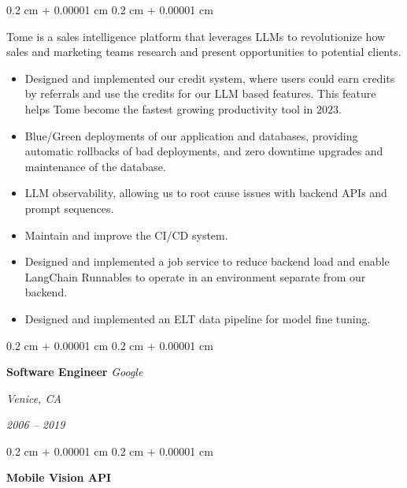 \documentclass[12pt, letterpaper]{article}
\newenvironment{highlights}{
    \begin{itemize}[
        topsep=0.10 cm,
        parsep=0.10 cm,
        partopsep=0pt,
        itemsep=0pt,
        leftmargin=0.4 cm + 10pt
    ]
}{
    \end{itemize}
} %
\newenvironment{onecolentry}{
    \begin{adjustwidth}{
        0.2 cm + 0.00001 cm
    }{
        0.2 cm + 0.00001 cm
    }
}{
    \end{adjustwidth}
} %
\newenvironment{twocolentry}[2][]{
    \onecolentry
    \def\secondColumn{#2}
    \setcolumnwidth{\fill, 4.5 cm}
    \begin{paracol}{2}
}{
    \switchcolumn \raggedleft \secondColumn
    \end{paracol}
    \endonecolentry
} %
\begin{document}
        \vspace{0.10 cm}
        \begin{onecolentry}
            Tome is a sales intelligence platform that leverages LLMs to revolutionize how sales and marketing teams research and present opportunities to potential clients.
            \begin{highlights}
                \item Designed and implemented our credit system, where users could earn credits by referrals and use the credits for our LLM based features.  This feature helps Tome become the fastest growing productivity tool in 2023.
                \item Blue/Green deployments of our application and databases, providing automatic rollbacks of bad deployments, and zero downtime upgrades and maintenance of the database.
                \item LLM observability, allowing us to root cause issues with backend APIs and prompt sequences.
                \item Maintain and improve the CI/CD system.
                \item Designed and implemented a job service to reduce backend load and enable LangChain Runnables to operate in an environment separate from our backend.
                \item Designed and implemented an ELT data pipeline for model fine tuning.
            \end{highlights}
        \end{onecolentry}

        \vspace{0.2 cm}

        \begin{twocolentry}{
        \textit{Venice, CA}    
            
        \textit{2006 – 2019}}
            \textbf{Software Engineer}
            \textit{Google}
        \end{twocolentry}

        \vspace{0.10 cm}
        \begin{onecolentry}
            \textbf{Mobile Vision API}
        \end{onecolentry}
\end{document}
